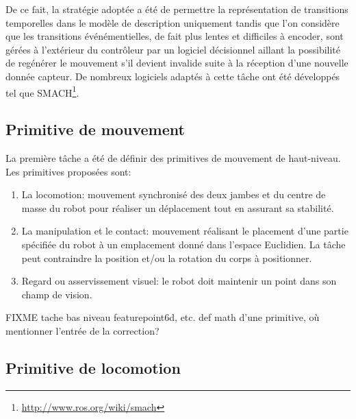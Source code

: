 De ce fait, la stratégie adoptée a été de permettre la représentation
de transitions temporelles dans le modèle de description uniquement
tandis que l'on considère que les transitions événémentielles, de fait
plus lentes et difficiles à encoder, sont gérées à l'extérieur du
contrôleur par un logiciel décisionnel aillant la possibilité de
regénérer le mouvement s'il devient invalide suite à la réception
d'une nouvelle donnée capteur. De nombreux logiciels adaptés à cette
tâche ont été développés tel que
SMACH\footnote{\url{http://www.ros.org/wiki/smach}}.


\subsection{Primitive de mouvement}

La première tâche a été de définir des primitives de mouvement de
haut-niveau. Les primitives proposées sont:
\begin{enumerate}
\item La locomotion: mouvement synchronisé des deux jambes et du
  centre de masse du robot pour réaliser un déplacement tout en
  assurant sa stabilité.
\item La manipulation et le contact: mouvement réalisant le placement
  d'une partie spécifiée du robot à un emplacement donné dans l'espace
  Euclidien. La tâche peut contraindre la position et/ou la rotation
  du corps à positionner.
\item Regard ou asservissement visuel: le robot doit maintenir un
  point dans son champ de vision.
\end{enumerate}

FIXME tache bas niveau featurepoint6d, etc. def math d'une primitive, où mentionner l'entrée de la correction?

\subsection{Primitive de locomotion}

